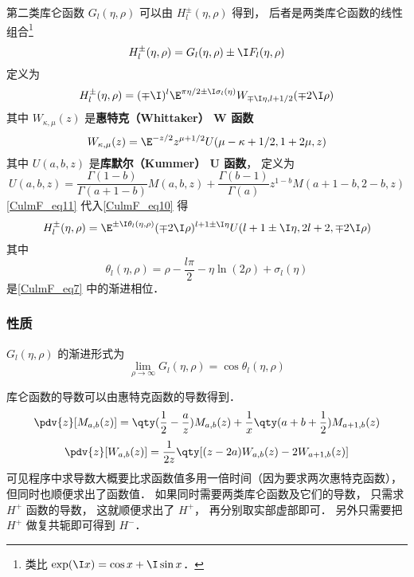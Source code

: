 第二类库仑函数 $G_l(\eta, \rho)$ 可以由 $H_l^\pm(\eta, \rho)$ 得到， 后者是两类库仑函数的线性组合\footnote{类比 $\exp(\I x) = \cos x + \I\sin x$．}
\begin{equation}
H_l^\pm(\eta, \rho) = G_l(\eta, \rho) \pm \I F_l(\eta, \rho)
\end{equation}	
定义为
\begin{equation}\label{CulmF_eq10}
H_l^\pm(\eta, \rho) = (\mp\I)^l \E^{\pi\eta/2 \pm \I \sigma_l(\eta)} W_{\mp\I\eta, l + 1/2}(\mp 2\I\rho)
\end{equation}
其中 $W_{\kappa, \mu}(z)$ 是\textbf{惠特克（Whittaker） W 函数}
\begin{equation}\label{CulmF_eq11}
W_{\kappa, \mu}(z) = \E^{-z/2} z^{\mu + 1/2} U(\mu - \kappa + 1/2, 1 + 2\mu, z)
\end{equation}
其中 $U(a, b, z)$ 是\textbf{库默尔（Kummer） U 函数}， 定义为
\begin{equation}
U(a, b, z) = \frac{\Gamma(1 - b)}{\Gamma(a + 1 - b)} M(a, b, z) + \frac{\Gamma(b - 1)}{\Gamma(a)} z^{1 - b} M(a + 1 - b, 2 - b, z)
\end{equation}
\autoref{CulmF_eq11} 代入\autoref{CulmF_eq10} 得
\begin{equation}
H_l^\pm(\eta, \rho) = \E^{\pm\I\theta_l(\eta, \rho)}(\mp 2\I\rho)^{l + 1 \pm\I\eta} U(l + 1 \pm \I\eta, 2l + 2, \mp2\I\rho)
\end{equation}
其中
\begin{equation}
\theta_l(\eta, \rho) = \rho - \frac{l\pi}{2} - \eta\ln(2\rho) + \sigma_l(\eta)
\end{equation}
是\autoref{CulmF_eq7} 中的渐进相位．

\subsubsection{性质}
$G_l(\eta,\rho)$ 的渐进形式为
\begin{equation}
\lim_{\rho\to \infty} G_l(\eta, \rho) = \cos\theta_l(\eta, \rho)
\end{equation}

库仑函数的导数可以由惠特克函数的导数得到．
\begin{equation}
\pdv{z} [M_{a, b}(z)] = \qty(\frac12 - \frac{a}{z}) M_{a, b}(z) + \frac{1}{x} \qty(a + b + \frac12) M_{a+1, b}(z)
\end{equation}
\begin{equation}
\pdv{z} [W_{a, b}(z)] = \frac{1}{2z} \qty[(z - 2a) W_{a, b}(z) - 2W_{a+1, b}(z)]
\end{equation}
可见程序中求导数大概要比求函数值多用一倍时间（因为要求两次惠特克函数）， 但同时也顺便求出了函数值． 如果同时需要两类库仑函数及它们的导数， 只需求 $H^+$ 函数的导数， 这就顺便求出了 $H^+$， 再分别取实部虚部即可． 另外只需要把 $H^+$ 做复共轭即可得到 $H^-$．

